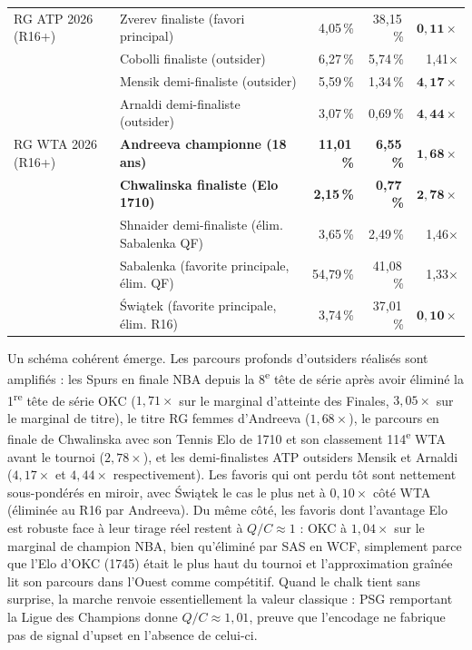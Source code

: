 \documentclass[11pt]{article}
\begin{document}
\begin{table}[!htbp]
\begin{tabular}{llrrr}
\midrule
RG ATP 2026 (R16+) & Zverev finaliste (favori principal) & 4,05\,\% & 38,15\,\% & $\mathbf{0{,}11\times}$ \\
                   & Cobolli finaliste (outsider)        & 6,27\,\% & 5,74\,\% & 1,41$\times$ \\
                   & Mensik demi-finaliste (outsider)    & 5,59\,\% & 1,34\,\% & $\mathbf{4{,}17\times}$ \\
                   & Arnaldi demi-finaliste (outsider)   & 3,07\,\% & 0,69\,\% & $\mathbf{4{,}44\times}$ \\
\midrule
RG WTA 2026 (R16+) & \textbf{Andreeva championne (18 ans)} & \textbf{11,01\,\%} & \textbf{6,55\,\%} & $\mathbf{1{,}68\times}$ \\
                   & \textbf{Chwalinska finaliste (Elo 1710)} & \textbf{2,15\,\%} & \textbf{0,77\,\%} & $\mathbf{2{,}78\times}$ \\
                   & Shnaider demi-finaliste (élim. Sabalenka QF) & 3,65\,\% & 2,49\,\% & 1,46$\times$ \\
                   & Sabalenka (favorite principale, élim. QF) & 54,79\,\% & 41,08\,\% & 1,33$\times$ \\
                   & Świątek (favorite principale, élim. R16) & 3,74\,\% & 37,01\,\% & $\mathbf{0{,}10\times}$ \\
\bottomrule
\end{tabular}
\end{table}

Un schéma cohérent émerge. Les parcours profonds d'outsiders réalisés
sont amplifiés : les Spurs en finale NBA depuis la
8\textsuperscript{e} tête de série après avoir éliminé la
1\textsuperscript{re} tête de série OKC ($1{,}71\times$ sur le marginal
d'atteinte des Finales, $3{,}05\times$ sur le marginal de titre), le
titre RG femmes d'Andreeva ($1{,}68\times$), le parcours en finale de
Chwalinska avec son Tennis Elo de 1710 et son classement
114\textsuperscript{e} WTA avant le tournoi ($2{,}78\times$), et les
demi-finalistes ATP outsiders Mensik et Arnaldi ($4{,}17\times$ et
$4{,}44\times$ respectivement). Les favoris qui ont perdu tôt sont
nettement sous-pondérés en miroir, avec Świątek le cas le plus net à
$0{,}10\times$ côté WTA (éliminée au R16 par Andreeva). Du même côté,
les favoris dont l'avantage Elo est robuste face à leur tirage réel
restent à $Q/C \approx 1$ : OKC à $1{,}04\times$ sur le marginal de
champion NBA, bien qu'éliminé par SAS en WCF, simplement parce que
l'Elo d'OKC (1745) était le plus haut du tournoi et l'approximation
graînée lit son parcours dans l'Ouest comme compétitif. Quand le chalk
tient sans surprise, la marche renvoie essentiellement la valeur
classique : PSG remportant la Ligue des Champions donne
$Q/C \approx 1{,}01$, preuve que l'encodage ne fabrique pas de signal
d'upset en l'absence de celui-ci.
\end{document}

